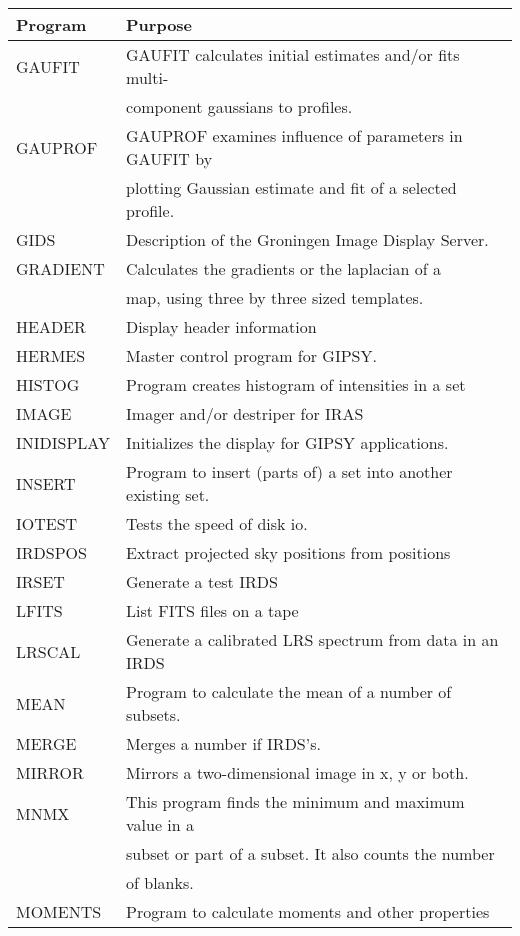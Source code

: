\begin{table}
\begin{center}
\begin{tabular}{ | l | l | }
\hline
Program & Purpose \\
\hline
GAUFIT     & GAUFIT calculates initial estimates and/or fits multi-\\
           & component gaussians to profiles.\\
GAUPROF    & GAUPROF examines influence of parameters in GAUFIT by \\
           & plotting Gaussian estimate and fit of a selected profile.\\
GIDS       & Description of the Groningen Image Display Server.\\
GRADIENT   & Calculates the gradients or the laplacian of a \\
           & map, using three by three sized templates.\\
HEADER     & Display header information\\
HERMES     & Master control program for GIPSY.\\
HISTOG     & Program creates histogram of intensities in a set\\
IMAGE      & Imager and/or destriper for IRAS \\
INIDISPLAY & Initializes the display for GIPSY applications.\\
INSERT     & Program to insert (parts of) a set into another existing set.\\
IOTEST   & Tests the speed of disk io.\\
IRDSPOS  & Extract projected sky positions from positions\\
IRSET    & Generate a test IRDS\\
LFITS    & List FITS files on a tape\\
LRSCAL   & Generate a calibrated LRS spectrum from data in an IRDS\\
MEAN     & Program to calculate the mean of a number of subsets.\\
MERGE    & Merges a number if IRDS's.\\
MIRROR   & Mirrors a two-dimensional image in x, y or both.\\
MNMX     & This program finds the minimum and maximum value in a\\
         & subset or part of a subset. It also counts the number\\
         & of blanks.\\
MOMENTS  & Program to calculate moments and other properties\\

\end{tabular}
\end{center}
\end{table}
